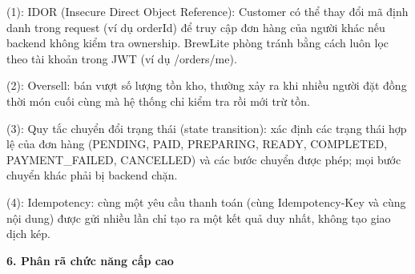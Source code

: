 \documentclass[11pt,a4paper,oneside]{report}
\begin{document}
(1): IDOR (Insecure Direct Object Reference): Customer có thể thay đổi mã định danh trong request (ví dụ orderId) để truy cập đơn hàng của người khác nếu backend không kiểm tra ownership. BrewLite phòng tránh bằng cách luôn lọc theo tài khoản trong JWT (ví dụ /orders/me).

(2): Oversell: bán vượt số lượng tồn kho, thường xảy ra khi nhiều người đặt đồng thời món cuối cùng mà hệ thống chỉ kiểm tra rồi mới trừ tồn.

(3): Quy tắc chuyển đổi trạng thái (state transition): xác định các trạng thái hợp lệ của đơn hàng (PENDING, PAID, PREPARING, READY, COMPLETED, PAYMENT\_FAILED, CANCELLED) và các bước chuyển được phép; mọi bước chuyển khác phải bị backend chặn.

(4): Idempotency: cùng một yêu cầu thanh toán (cùng Idempotency-Key và cùng nội dung) được gửi nhiều lần chỉ tạo ra một kết quả duy nhất, không tạo giao dịch kép.

\textbf{6. Phân rã chức năng cấp cao}
\end{document}
